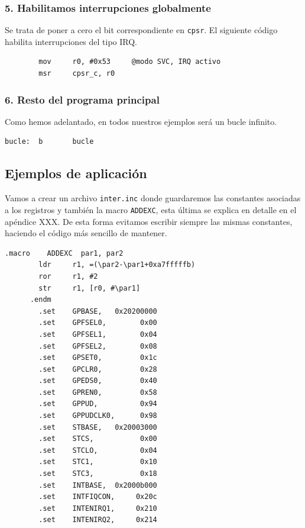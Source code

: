 \subsubsection{5. Habilitamos interrupciones globalmente}

Se trata de poner a cero el bit correspondiente en {\tt cpsr}. El siguiente código habilita
interrupciones del tipo IRQ.

\begin{lstlisting}
        mov     r0, #0x53     @modo SVC, IRQ activo
        msr     cpsr_c, r0
\end{lstlisting}

\subsubsection{6. Resto del programa principal}

Como hemos adelantado, en todos nuestros ejemplos será un bucle infinito.

\begin{lstlisting}
bucle:  b       bucle
\end{lstlisting}


\subsection{Ejemplos de aplicación}

Vamos a crear un archivo {\tt inter.inc} donde guardaremos las constantes
asociadas a los registros y también la macro {\tt ADDEXC}, esta última
se explica en detalle en el apéndice XXX. De esta forma evitamos escribir
siempre las mismas constantes, haciendo el código más sencillo de mantener.

\begin{lstlisting}[caption={inter.inc},label={lst:codigoPract5_0}]
      .macro    ADDEXC  par1, par2
        ldr     r1, =(\par2-\par1+0xa7fffffb)
        ror     r1, #2
        str     r1, [r0, #\par1]
      .endm
        .set    GPBASE,   0x20200000
        .set    GPFSEL0,        0x00
        .set    GPFSEL1,        0x04
        .set    GPFSEL2,        0x08
        .set    GPSET0,         0x1c
        .set    GPCLR0,         0x28
        .set    GPEDS0,         0x40
        .set    GPREN0,         0x58
        .set    GPPUD,          0x94
        .set    GPPUDCLK0,      0x98
        .set    STBASE,   0x20003000
        .set    STCS,           0x00
        .set    STCLO,          0x04
        .set    STC1,           0x10
        .set    STC3,           0x18
        .set    INTBASE,  0x2000b000
        .set    INTFIQCON,     0x20c
        .set    INTENIRQ1,     0x210
        .set    INTENIRQ2,     0x214
\end{lstlisting}

